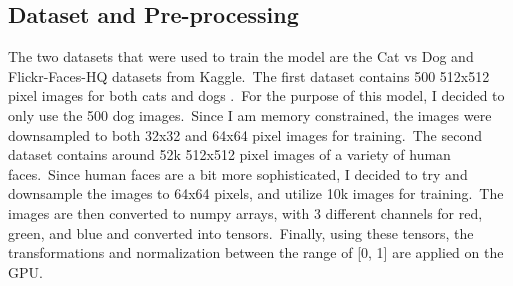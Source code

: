 \documentclass[12pt]{article}
\begin{document}
\subsection{Dataset and Pre-processing}
The two datasets that were used to train the model are the Cat vs Dog \cite{dog} and Flickr-Faces-HQ \cite{faces} datasets from Kaggle.\
The first dataset contains 500 512x512 pixel images for both cats and dogs .\
For the purpose of this model, I decided to only use the 500 dog images.\
Since I am memory constrained, the images were downsampled to both 32x32 and 64x64 pixel images for training.\
The second dataset contains around 52k 512x512 pixel images of a variety of human faces.\
Since human faces are a bit more sophisticated, I decided to try and downsample the images to 64x64 pixels, and utilize 10k images for training.\
The images are then converted to numpy arrays, with 3 different channels for red, green, and blue and converted into tensors.\
Finally, using these tensors, the transformations and normalization between the range of [0, 1] are applied on the GPU.\
\end{document}
